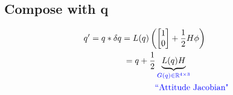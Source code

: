 \documentclass[11pt]{article}
\begin{document}
\subsection{Compose with q}
\begin{align*}
    q' &= q*\delta q = L(q)\left(
     \begin{bmatrix}
         1 \\
         0
     \end{bmatrix}
     + \frac{1}{2}H\phi
    \right)
    \\
    & \hspace{14mm} = q + \frac{1}{2} \underbrace{L(q)H}_{\textcolor{blue}{G(q) \in \mathbb{R}^{4\times3}}}
    \\
    &\hspace{27mm}\textcolor{blue}{\text{``Attitude Jacobian"}}
\end{align*}
\end{document}
